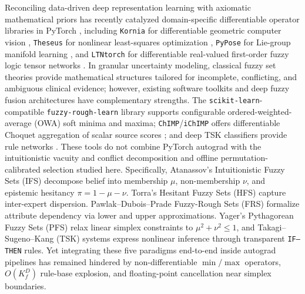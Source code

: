 \documentclass[10pt,twocolumn]{article}
\begin{document}
Reconciling data-driven deep representation learning with axiomatic mathematical priors has
recently catalyzed domain-specific differentiable operator libraries in PyTorch
\cite{paszke2019pytorch}, including \texttt{Kornia} for differentiable geometric computer
vision \cite{riba2020kornia}, \texttt{Theseus} for nonlinear least-squares optimization
\cite{pineda2022theseus}, \texttt{PyPose} for Lie-group manifold learning
\cite{wang2023pypose}, and \texttt{LTNtorch} for differentiable real-valued first-order
fuzzy logic tensor networks \cite{badreddine2022ltntorch}. In granular uncertainty modeling,
classical fuzzy set theories \cite{zadeh1965fuzzy} provide mathematical structures tailored for
incomplete, conflicting, and ambiguous clinical evidence; however, existing software toolkits
and deep fuzzy fusion architectures have complementary strengths. The
\texttt{scikit-learn}-compatible \texttt{fuzzy-rough-learn} library
\cite{lenz2022fuzzyroughlearn} supports configurable ordered-weighted-average (OWA) soft
minima and maxima; \texttt{ChIMP}/\texttt{iChIMP} offers differentiable Choquet aggregation
of scalar source scores \cite{islam2020chimp}; and deep TSK classifiers provide rule networks
\cite{wu2020optimize,cui2021curse}. These tools do not combine PyTorch autograd with the
intuitionistic vacuity and conflict decomposition and offline permutation-calibrated selection
studied here. Specifically, Atanassov's
Intuitionistic Fuzzy Sets (IFS)
\cite{atanassov1986intuitionistic,xu2007intuitionistic} decompose belief into membership $\mu$,
non-membership $\nu$, and epistemic hesitancy $\pi = 1 - \mu - \nu$. Torra's Hesitant Fuzzy
Sets (HFS) \cite{torra2010hesitant,xia2011hesitant,xia2012entropy,liao2013vikor} capture
inter-expert dispersion. Pawlak--Dubois--Prade Fuzzy-Rough Sets (FRS)
\cite{pawlak1982rough,dubois1990rough,jensen2004fuzzy} formalize attribute dependency via lower
and upper approximations. Yager's Pythagorean Fuzzy Sets (PFS) \cite{yager2014pythagorean}
relax linear simplex constraints to $\mu^2 + \nu^2 \le 1$, and Takagi--Sugeno--Kang (TSK)
systems \cite{takagi1985fuzzy,jang1993anfis,wu2020optimize,cui2021curse} express nonlinear
inference through transparent \texttt{IF--THEN} rules. Yet integrating these five paradigms
end-to-end inside autograd pipelines has remained hindered by non-differentiable $\min/\max$
operators, $O(K_f^D)$ rule-base explosion, and floating-point cancellation near simplex
boundaries.
\end{document}
